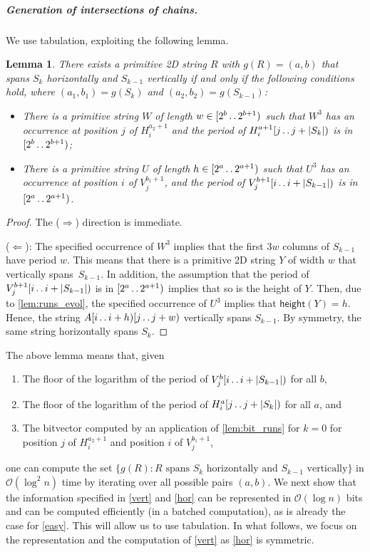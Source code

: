 \documentclass[11pt,letterpaper]{article}
\newcommand{\cO}{\mathcal{O}}
\newcommand{\height}{\textsf{height}}
\def\dd{\mathinner{.\,.}}
\newcommand{\hmeta}[2]{H_{#1}^{#2}}
\newcommand{\vmeta}[2]{V_{#1}^{#2}}
\newtheorem{lemma}[theorem]{Lemma}
\begin{document}
\subparagraph{Generation of intersections of chains.}
We use tabulation, exploiting the following lemma.

\begin{lemma}\label{lem:four_russians}
There exists a primitive 2D string $R$ with $g(R)=(a,b)$ that spans $S_k$ horizontally and $S_{k-1}$ vertically if and only if the following conditions hold, where $(a_1,b_1)=g(S_k)$ and $(a_2,b_2)=g(S_{k-1})$:
\begin{itemize}
\item There is a primitive string $W$ of length $w \in [2^b \dd 2^{b+1})$ such that $W^3$ has an occurrence at position $j$ of $\hmeta{i}{a_2+1}$
and the period of $\hmeta{i}{a+1}[j \dd j+|S_{k}|)$ is in $[2^b \dd 2^{b+1})$;
\item There is a primitive string $U$ of length $h \in [2^a \dd 2^{a+1})$ such that $U^3$ has an occurrence at position $i$ of $\vmeta{j}{b_1+1}$,
and the period of $\vmeta{j}{b+1}[i \dd i+|S_{k-1}|)$ is in $[2^a \dd 2^{a+1})$.
\end{itemize}
\end{lemma}
\begin{proof}
The ($\Rightarrow$) direction is immediate.

($\Leftarrow$):
The specified occurrence of $W^3$ implies that the first $3w$ columns of $S_{k-1}$ have period $w$.
This means that there is a primitive 2D string $Y$ of width $w$ that vertically spans~$S_{k-1}$.
In addition, the assumption that the period of $\vmeta{j}{b+1}[i \dd i+|S_{k-1}|)$ is in $[2^a \dd 2^{a+1})$ implies that so is the height of $Y$.
Then, due to \cref{lem:runs_evol}, the specified occurrence of $U^3$ implies that $\height(Y)=h$.
Hence, the string $A[i \dd i+h)[j \dd j+w)$ vertically spans $S_{k-1}$.
By symmetry, the same string horizontally spans $S_{k}$.
\end{proof}

The above lemma means that, given
\begin{enumerate}[label = {(\arabic*)}]
\item The floor of the logarithm of the period of $\vmeta{j}{b}[i \dd i+|S_{k-1}|)$ for all $b$,\label{vert}
\item The floor of the logarithm of the period of $\hmeta{i}{a}[j \dd j+|S_{k}|)$ for all $a$, and\label{hor}
\item The bitvector computed by an application of \cref{lem:bit_runs} for $k=0$ for position $j$ of $\hmeta{i}{a_2+1}$ and position $i$ of $\vmeta{j}{b_1+1}$,\label{easy}
\end{enumerate}
one can compute the set $\{g(R): R \text{ spans $S_k$ horizontally and $S_{k-1}$ vertically}\}$ in $\cO(\log^2 n)$ time by iterating over all possible pairs $(a,b)$.
We next show that the information specified in \ref{vert} and \ref{hor} can be represented in $\cO(\log n)$ bits and can be computed efficiently (in a batched computation), as is already the case for \ref{easy}.
This will allow us to use tabulation.
In what follows, we focus on the representation and the computation of \ref{vert} as \ref{hor} is symmetric.
\end{document}
